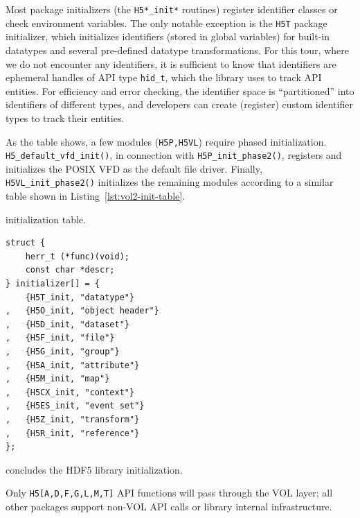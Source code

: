 Most package initializers (the \texttt{H5*\_init*} routines) register identifier classes or check environment variables. The only notable exception is the \texttt{H5T} package initializer, which initializes identifiers (stored in global variables) for built-in datatypes and several pre-defined datatype transformations. For this tour, where we do not encounter any identifiers, it is sufficient to know that identifiers are ephemeral handles of API type \texttt{hid\_t}, which the library uses to track API entities. For efficiency and error checking, the identifier space is ``partitioned'' into identifiers of different types, and developers can create (register) custom identifier types to track their entities.

As the table shows, a few modules (\texttt{H5P,H5VL}) require phased initialization. \texttt{H5\_default\_vfd\_init()}, in connection with \texttt{H5P\_init\_phase2()},  registers and initializes the POSIX VFD as the default file driver. Finally, \texttt{H5VL\_init\_phase2()} initializes the remaining modules according to a similar table shown in Listing~\ref{lst:vol2-init-table}.

\begin{listing}
\centering
\caption{ initialization table.}
\label{lst:vol2-init-table}
\begin{verbatim}
struct {
    herr_t (*func)(void);
    const char *descr;
} initializer[] = {
    {H5T_init, "datatype"}
,   {H5O_init, "object header"}
,   {H5D_init, "dataset"}
,   {H5F_init, "file"}
,   {H5G_init, "group"}
,   {H5A_init, "attribute"}
,   {H5M_init, "map"}
,   {H5CX_init, "context"}
,   {H5ES_init, "event set"}
,   {H5Z_init, "transform"}
,   {H5R_init, "reference"}
};
\end{verbatim}
\end{listing}

 concludes the HDF5 library initialization.

Only \texttt{H5[A,D,F,G,L,M,T]} API functions will pass through the VOL layer; all other packages support non-VOL API calls or library internal infrastructure.

\noindent{}

